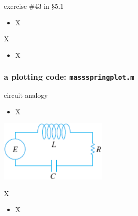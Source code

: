 \documentclass[urlcolor=blue]{beamer}
\begin{document}
\begin{frame}{exercise \#43 in \S5.1}

\begin{itemize}
\item X
\end{itemize}
\end{frame}


\begin{frame}{X}

\begin{itemize}
\item X
\end{itemize}
\end{frame}


\begin{frame}[fragile]
\frametitle{a plotting code: \texttt{massspringplot.m}}

\end{frame}


\begin{frame}{circuit analogy}

\begin{itemize}
\item X
\end{itemize}

\includegraphics[width=0.4\textwidth]{figs/rlc-circuit}
\end{frame}


\begin{frame}{X}

\begin{itemize}
\item X
\end{itemize}
\end{frame}
\end{document}
